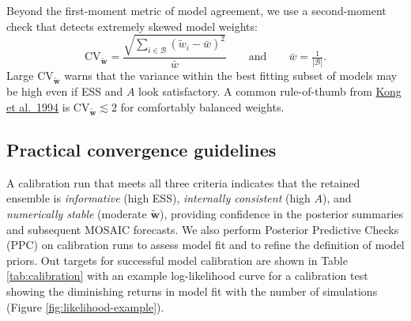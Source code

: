 \documentclass[
]{book}
\begin{document}
Beyond the first-moment metric of model agreement, we use a second-moment check that detects extremely skewed model weights:
\begin{equation}
\mathrm{CV}_\mathbf{\tilde{w}}
=
\frac{\sqrt{\sum_{i\in\mathcal B}(\tilde{w}_i-\bar w)^2}}
     {\bar w}
\qquad \text{and} \qquad
\bar w=\tfrac1{|\mathcal B|}.
\label{eq:cvw}
\end{equation}
Large \(\mathrm{CV}_\mathbf{\tilde{w}}\) warns that the variance within the best fitting subset of models may be high even if ESS and \(A\) look satisfactory. A common rule-of-thumb from \href{https://doi.org/10.1080/01621459.1994.10476469}{Kong et al.~1994} is \(\mathrm{CV}_\mathbf{\tilde{w}}\!\lesssim\!2\) for comfortably balanced weights.

\subsection{Practical convergence guidelines}\label{practical-convergence-guidelines}

A calibration run that meets all three criteria indicates that the retained ensemble is \emph{informative} (high ESS), \emph{internally consistent} (high \(A\)), and \emph{numerically stable} (moderate \(\mathbf{\tilde{w}}\)), providing confidence in the posterior summaries and subsequent MOSAIC forecasts. We also perform Posterior Predictive Checks (PPC) on calibration runs to assess model fit and to refine the definition of model priors. Out targets for successful model calibration are shown in Table \ref{tab:calibration} with an example log-likelihood curve for a calibration test showing the diminishing returns in model fit with the number of simulations (Figure \ref{fig:likelihood-example}).
\end{document}
